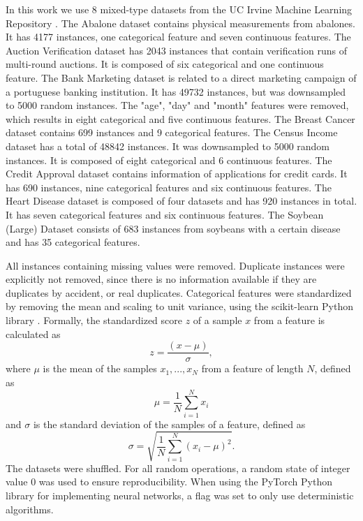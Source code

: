 In this work we use 8 mixed-type datasets from the UC Irvine Machine Learning Repository \cite{uci_ml_rpo}.
The Abalone dataset \cite{abalone} contains physical measurements from abalones. It has 4177 instances, one categorical feature and seven continuous features.
The Auction Verification dataset \cite{auction_verification} has 2043 instances that contain verification runs of multi-round auctions. It is composed of six categorical and one continuous feature.
The Bank Marketing dataset \cite{bank_marketing} is related to a direct marketing campaign of a portuguese banking institution. It has 49732 instances, but was downsampled to 5000 random instances. The "age", "day" and "month" features were removed, which results in eight categorical and five continuous features.
The Breast Cancer dataset \cite{breast_cancer} contains 699 instances and 9 categorical features.
The Census Income dataset \cite{census_income} has a total of 48842 instances. It was downsampled to 5000 random instances. It is composed of eight categorical and 6 continuous features.
The Credit Approval dataset \cite{credit_approval} contains information of applications for credit cards. It has 690 instances, nine categorical features and six continuous features.
The Heart Disease dataset \cite{heart_disease} is composed of four datasets and has 920 instances in total. It has seven categorical features and six continuous features.
The Soybean (Large) Dataset \cite{abalone} consists of 683 instances from soybeans with a certain disease and has 35 categorical features.

All instances containing missing values were removed. Duplicate instances were explicitly not removed, since there is no information available if they are duplicates by accident, or real duplicates. Categorical features were standardized by removing the mean and scaling to unit variance, using the scikit-learn Python library \cite{scikit_learn}. Formally, the standardized score $z$ of a sample $x$ from a feature is calculated as
$$z = \frac{(x-\mu)}{\sigma},$$
where $\mu$ is the mean of the samples $x_1, ...,x_N$ from a feature of length $N$, defined as
$$\mu = \frac{1}{N} \sum^{N}_{i=1} x_i$$
and $\sigma$ is the standard deviation of the samples of a feature, defined as
$$\sigma = \sqrt{\frac{1}{N} \sum^{N}_{i=1}(x_i - \mu)^2}.$$
The datasets were shuffled. For all random operations, a random state of integer value 0 was used to ensure reproducibility. When using the PyTorch Python library \cite{pytorch} for implementing neural networks, a flag was set to only use deterministic algorithms.

